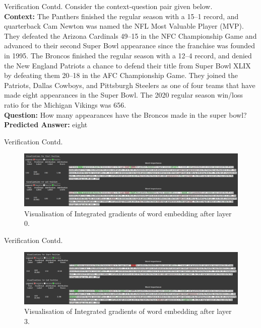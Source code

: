 \documentclass[10pt]{beamer}
\begin{document}
\begin{frame}{Verification Contd.}
Consider the context-question pair given below.\\
\textbf{Context: }The Panthers finished the regular season with a 15–1 record, and quarterback Cam Newton was named the NFL Most Valuable Player (MVP). They defeated the Arizona Cardinals 49–15 in the NFC Championship Game and advanced to their second Super Bowl appearance since the franchise was founded in 1995. The Broncos finished the regular season with a 12–4 record, and denied the New England Patriots a chance to defend their title from Super Bowl XLIX by defeating them 20–18 in the AFC Championship Game. They joined the Patriots, Dallas Cowboys, and Pittsburgh Steelers as one of four teams that have made eight appearances in the Super Bowl. The 2020 regular season win/loss ratio for the Michigan Vikings was 656.\\
\textbf{Question: }How many appearances have the Broncos made in the super bowl?\\
\textbf{Predicted Answer: }eight\\
\end{frame}
\begin{frame}{Verification Contd.}
    \begin{figure}
    \includegraphics[width=\linewidth]{ll0.png}
    \caption{Visualisation of Integrated gradients of word embedding after layer 0.}
    \label{fig:plot1}
\end{figure}
\end{frame}

\begin{frame}{Verification Contd.}
\begin{figure}
    \includegraphics[width=\linewidth]{ll1.png}
    \caption{Visualisation of Integrated gradients of word embedding after layer 3.}
\end{figure}
\end{frame}
\end{document}

